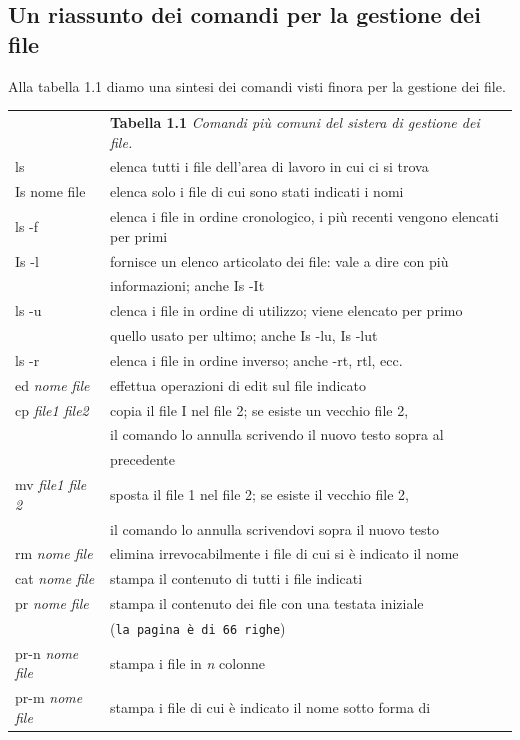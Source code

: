 \subsection{Un riassunto dei comandi per la gestione dei file}
Alla tabella 1.1 diamo una sintesi dei comandi visti finora per la gestione dei file.\\
\begin{tabular}{|ll|}
	\hline
	&\textbf{Tabella 1.1} \textit{Comandi più comuni del sistera di gestione dei file.}\\
	ls&elenca tutti i file dell'area di lavoro in cui ci si trova\\
	Is nome file& elenca solo i file di cui sono stati indicati i nomi\\
	ls -f &elenca i file in ordine cronologico, i più recenti vengono
	elencati per primi\\
	Is -l &fornisce un elenco articolato dei file: vale a dire con più\\
			& informazioni; anche Is -It\\
	ls -u & clenca i file in ordine di utilizzo; viene elencato per primo\\
			& quello usato per ultimo; anche Is -lu, Is -lut\\
	ls -r & elenca i file in ordine inverso; anche -rt, rtl, ecc.\\
	ed {\it nome file} & effettua operazioni di edit sul file indicato\\
	cp \textit{file1 file2} & copia il file I nel file 2; se esiste un vecchio file 2,\\
									& il comando lo annulla scrivendo il nuovo testo sopra al\\
									& precedente\\
	mv \textit{file1 file 2}& sposta il file 1 nel file 2; se esiste il vecchio file 2,\\
	&il comando lo annulla scrivendovi sopra il nuovo testo\\
	rm \textit{nome file}&elimina irrevocabilmente i file di cui si è indicato il nome\\
	cat \textit{nome file}& stampa il contenuto di tutti i file indicati\\
	pr \textit{nome file} &stampa il contenuto dei file con una testata iniziale\\
	&(\texttt{la pagina è di 66 righe})\\
	pr-n \textit{nome file}&stampa i file in \textit{n} colonne\\
	pr-m \textit{nome file} &stampa i file di cui è indicato il nome sotto forma di\\

\end{tabular}

